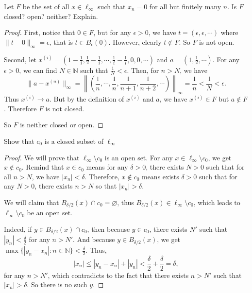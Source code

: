 \documentclass[12pt, a4paper]{article}
\theoremstyle{plain}
\newcommand{\N}{\mathbb{N}}
\begin{document}
\begin{exercise}{12}
Let $F$ be the set of all $x\in \ell_\infty$ such that $x_n=0$ for all but finitely many $n$. Is $F$ closed? open? neither? Explain.
\end{exercise}
	\begin{proof}
	First, notice that $0\in F$, but for any $\epsilon >0$, we have $t=(\epsilon,\epsilon,\cdots)$ where $\|t-0\|_\infty=\epsilon$, that is $t\in B_\epsilon(0)$. However, clearly $t\notin F$. So $F$ is not open.
	
	Second, let $x^{(i)}=(1-\frac{1}{i},\frac{1}{2}-\frac{1}{i},\cdots,\frac{1}{i}-\frac{1}{i},0,0,\cdots)$ and $a=(1,\frac{1}{2},\cdots)$. For any $\epsilon>0$, we can find $N\in\N$ such that $\frac{1}{N}<\epsilon$. Then, for $n>N$, we have
	\[
	\|a-x^{(n)}\|_\infty=\left\|\left(\frac{1}{n},\cdots,\frac{1}{n},\frac{1}{n+1},\frac{1}{n+2},\cdots\right)\right\|_\infty=\frac{1}{n}<\frac{1}{N}<\epsilon.
	\]
	Thus $x^{(i)}\rightarrow a$. But by the definition of $x^{(i)}$ and $a$, we have $x^{(i)}\in F$ but $a\notin F$. Therefore $F$ is not closed.
	
	So $F$ is neither closed or open. 
	\end{proof}

\begin{exercise}{13}
Show that $c_0$ is a closed subset of $\ell_\infty$
\end{exercise}
	\begin{proof}
	We will prove that $\ell_\infty\setminus c_0$ is an open set. For any $x\in \ell_\infty\setminus c_0$, we get $x\notin c_0$. Remind that $x\in c_0$ means for any $\delta >0$, there exists $N>0$ such that for all $n>N$, we have $|x_n|<\delta$. Therefore, $x\notin c_0$ means exists $\delta>0$ such that for any $N>0$, there exists $n>N$ so that $|x_n|>\delta$.
	
	 We will claim that $B_{\delta/2}(x)\cap c_0=\varnothing$, thus $B_{\delta/2}(x)\in \ell_\infty\setminus c_0$, which leads to $\ell_\infty\setminus c_0$ be an open set.
	
	 Indeed, if $y\in B_{\delta/2}(x)\cap c_0$, then because $y\in c_0$, there exists $N'$ such that $|y_n|<\frac{\delta}{2}$ for any $n>N'$. And because $y\in B_{\delta/2}(x)$, we get $\max\{|y_n-x_n|:n\in \N\}<\frac{\delta}{2}$. Thus,
	 \[
	 |x_n|\leq |y_n-x_n|+|y_n|<\frac{\delta}{2}+\frac{\delta}{2}=\delta,
	 \]
	 for any $n>N'$, which contradicts to the fact that there exists $n>N'$ such that $|x_n|>\delta$. So there is no such $y$.
	\end{proof}
\end{document}
